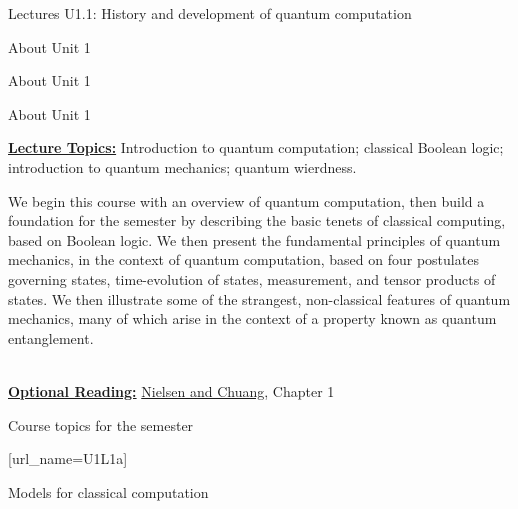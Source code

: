 
\begin{edXsection}{Lectures U1.1: History and development of quantum computation}


\begin{edXvertical}{About Unit 1}

\begin{edXtext}{About Unit 1}

{\LARGE About Unit 1}

{\noindent\bf \underline{Lecture Topics:}} Introduction to quantum
computation; classical Boolean logic; introduction to quantum
mechanics; quantum wierdness.

We begin this course with an overview of quantum computation, then
build a foundation for the semester by describing the basic tenets of
classical computing, based on Boolean logic.  We then present the
fundamental principles of quantum mechanics, in the context of quantum
computation, based on four postulates governing states, time-evolution
of states, measurement, and tensor products of states.  We then
illustrate some of the strangest, non-classical features of quantum
mechanics, many of which arise in the context of a property known as
quantum entanglement.

~\\
{\noindent\bf \underline{Optional Reading:}}
\href{https://www.amazon.com/Quantum-Computation-Information-10th-Anniversary/dp/1107002176}{Nielsen and Chuang}, Chapter 1


\end{edXtext}


\end{edXvertical}


\begin{edXvertical}{Course topics for the semester}

[url_name=U1L1a]


\end{edXvertical}


\begin{edXvertical}{Models for classical computation}


\end{edXvertical}
\end{edXsection}

